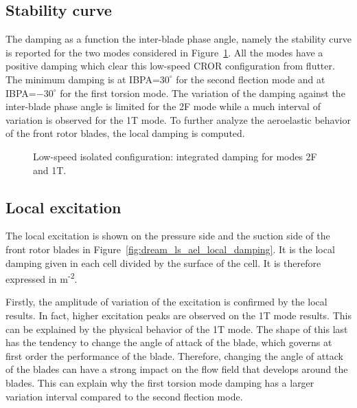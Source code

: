 
\subsection{Stability curve}
\label{sub:dream_ls_ael_curve}

The damping as a function the inter-blade phase angle, namely the stability
curve is reported for the two modes considered in Figure~\ref{fig:dream_ls_ael_damping}.
All the modes have a positive damping which clear this low-speed CROR configuration
from flutter. The minimum damping is at IBPA=$30^\circ$ for the second flection
mode and at IBPA=$-30^\circ$ for the first torsion mode.
The variation of the damping against the inter-blade phase angle is
limited for the 2F mode while a much interval of variation is
observed for the 1T mode. To further analyze the aeroelastic behavior
of the front rotor blades, the local damping is computed.
\begin{figure}[htp]
  \centering
  \caption{Low-speed isolated configuration: integrated damping for modes 2F and 1T.}
  \label{fig:dream_ls_ael_damping}
\end{figure}

\subsection{Local excitation}
\label{sub:dream_ls_ael_local_damping}

The local excitation is shown on the pressure side and
the suction side of the front rotor blades in 
Figure~\ref{fig:dream_ls_ael_local_damping}. It is the
local damping given in each cell divided by the 
surface of the cell. It is therefore expressed in
m\textsuperscript{-2}.

Firstly, the amplitude of variation of the excitation
is confirmed by the local results. In fact, higher excitation peaks
are observed on the 1T mode results. This can be explained
by the physical behavior of the 1T mode. The shape of this last
has the tendency to change the angle of attack of the blade,
which governs at first order the
performance of the blade. Therefore, changing the angle of attack
of the blades can have a strong impact on the flow field
that develops around the blades. This can explain why the
first torsion mode damping has a larger variation interval
compared to the second flection mode.

